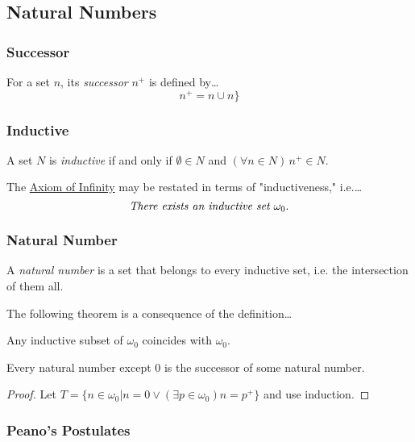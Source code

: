 \subsection{Natural Numbers}\label{naturalnumbers}

\subsubsection{Successor}\label{successor}
For a set $n$, its \emph{successor} $n^+$ is defined by\dots
$$n^+ = n \cup n\}$$

\subsubsection{Inductive}\label{inductive}
A set $N$ is \emph{inductive}\label{inductive} if and only if $\emptyset \in N$ and $(\forall n \in N) \, n^+ \in N.$\newline

\noindent The \hyperref[statementofsetaxioms]{Axiom of Infinity} may be restated in terms of "inductiveness," i.e.\dots $$\emph{There exists an inductive set } \omega_0.$$

\subsubsection{Natural Number}
A \emph{natural number} is a set that belongs to every inductive set, i.e. the intersection of them all.\newline

\noindent The following theorem is a consequence of the definition\dots

\begin{theorem}
Any inductive subset of $\omega_0$ coincides with $\omega_0$.
\end{theorem}

\begin{proposition}
Every natural number except $0$ is the successor of some natural number.
\end{proposition}

\begin{proof}
Let $T = \{n \in \omega_0 | n=0 \lor (\exists p \in \omega_0) n = p^+\}$ and use induction.
\end{proof}

\subsubsection{Peano's Postulates}


